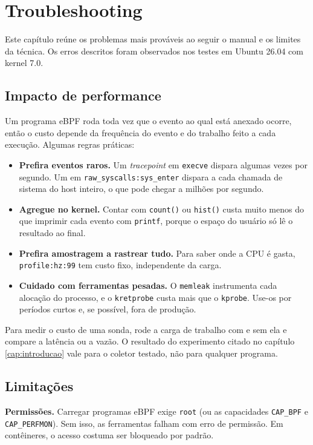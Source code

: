 \chapter{Troubleshooting}\label{cap:troubleshooting}

Este capítulo reúne os problemas mais prováveis ao seguir o manual e os limites da técnica. Os erros descritos foram observados nos testes em Ubuntu 26.04 com kernel 7.0.

\section{Impacto de performance}

Um programa eBPF roda toda vez que o evento ao qual está anexado ocorre, então o custo depende da frequência do evento e do trabalho feito a cada execução. Algumas regras práticas:

\begin{itemize}
  \item \textbf{Prefira eventos raros.} Um \textit{tracepoint} em \texttt{execve} dispara algumas vezes por segundo. Um em \texttt{raw\_syscalls:sys\_enter} dispara a cada chamada de sistema do host inteiro, o que pode chegar a milhões por segundo.
  \item \textbf{Agregue no kernel.} Contar com \texttt{count()} ou \texttt{hist()} custa muito menos do que imprimir cada evento com \texttt{printf}, porque o espaço do usuário só lê o resultado ao final.
  \item \textbf{Prefira amostragem a rastrear tudo.} Para saber onde a CPU é gasta, \texttt{profile:hz:99} tem custo fixo, independente da carga.
  \item \textbf{Cuidado com ferramentas pesadas.} O \texttt{memleak} instrumenta cada alocação do processo, e o \texttt{kretprobe} custa mais que o \texttt{kprobe}. Use-os por períodos curtos e, se possível, fora de produção.
\end{itemize}

Para medir o custo de uma sonda, rode a carga de trabalho com e sem ela e compare a latência ou a vazão. O resultado do experimento citado no capítulo \ref{cap:introducao} vale para o coletor testado, não para qualquer programa.

\section{Limitações}

\textbf{Permissões.} Carregar programas eBPF exige \texttt{root} (ou as capacidades \texttt{CAP\_BPF} e \texttt{CAP\_PERFMON}). Sem isso, as ferramentas falham com erro de permissão. Em contêineres, o acesso costuma ser bloqueado por padrão.

